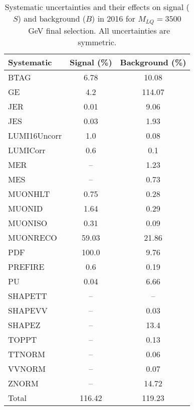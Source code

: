 \begin{table}[htbp]
\begin{center}
\caption{Systematic uncertainties and their effects on signal ($S$) and background ($B$) in 2016 for $M_{LQ}=3500$~GeV final selection. All uncertainties are symmetric.}
\begin{tabular}{lcc}
\hline\hline
Systematic & Signal (\%) & Background (\%) \\ \hline 
BTAG & 6.78 & 10.08\\ 
GE & 4.2 & 114.07\\ 
JER & 0.01 & 9.06\\ 
JES & 0.03 & 1.93\\ 
LUMI16Uncorr & 1.0 & 0.08\\ 
LUMICorr & 0.6 & 0.1\\ 
MER & -- & 1.23\\ 
MES & -- & 0.73\\ 
MUONHLT & 0.75 & 0.28\\ 
MUONID & 1.64 & 0.29\\ 
MUONISO & 0.31 & 0.09\\ 
MUONRECO & 59.03 & 21.86\\ 
PDF & 100.0 & 9.76\\ 
PREFIRE & 0.6 & 0.19\\ 
PU & 0.04 & 6.66\\ 
SHAPETT & -- & --\\ 
SHAPEVV & -- & 0.03\\ 
SHAPEZ & -- & 13.4\\ 
TOPPT & -- & 0.13\\ 
TTNORM & -- & 0.06\\ 
VVNORM & -- & 0.07\\ 
ZNORM & -- & 14.72\\ 
Total & 116.42 & 119.23\\ \hline \hline
\end{tabular}
\label{tab:SysUncertainties_uujj_3500}
\end{center}
\end{table}

